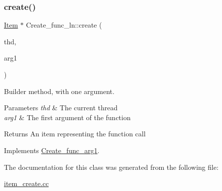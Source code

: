 \subsubsection{\texorpdfstring{create()}{create()}}
{\footnotesize\ttfamily \mbox{\hyperlink{classItem}{Item}} $\ast$ Create\+\_\+func\+\_\+ln\+::create (\begin{DoxyParamCaption}\item[{T\+HD $\ast$}]{thd,  }\item[{\mbox{\hyperlink{classItem}{Item}} $\ast$}]{arg1 }\end{DoxyParamCaption})\hspace{0.3cm}{\ttfamily [virtual]}}

Builder method, with one argument. 
\begin{DoxyParams}{Parameters}
{\em thd} & The current thread \\
\hline
{\em arg1} & The first argument of the function \\
\hline
\end{DoxyParams}
\begin{DoxyReturn}{Returns}
An item representing the function call 
\end{DoxyReturn}


Implements \mbox{\hyperlink{classCreate__func__arg1_a3e9a98f755cd82c3e762e334c955a8c9}{Create\+\_\+func\+\_\+arg1}}.



The documentation for this class was generated from the following file\+:\begin{DoxyCompactItemize}
\item 
\mbox{\hyperlink{item__create_8cc}{item\+\_\+create.\+cc}}\end{DoxyCompactItemize}
